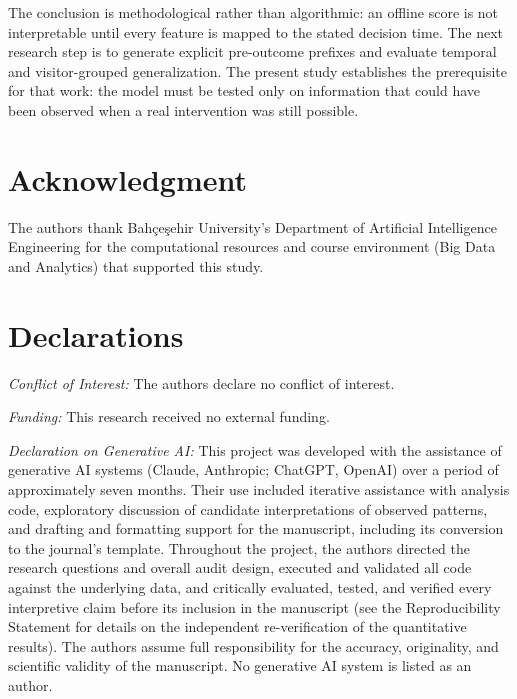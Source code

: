 \documentclass[conference, letterpaper]{IEEEtran}
\begin{document}
The conclusion is methodological rather than algorithmic: an offline score is not interpretable until every feature is mapped to the stated decision time. The next research step is to generate explicit pre-outcome prefixes and evaluate temporal and visitor-grouped generalization. The present study establishes the prerequisite for that work: the model must be tested only on information that could have been observed when a real intervention was still possible.

\section*{Acknowledgment}
The authors thank Bah\c{c}e\c{s}ehir University's Department of Artificial Intelligence Engineering for the computational resources and course environment (Big Data and Analytics) that supported this study.

\section*{Declarations}
\textit{Conflict of Interest:} The authors declare no conflict of interest.

\textit{Funding:} This research received no external funding.

\textit{Declaration on Generative AI:} This project was developed with the assistance of generative AI systems (Claude, Anthropic; ChatGPT, OpenAI) over a period of approximately seven months. Their use included iterative assistance with analysis code, exploratory discussion of candidate interpretations of observed patterns, and drafting and formatting support for the manuscript, including its conversion to the journal's template. Throughout the project, the authors directed the research questions and overall audit design, executed and validated all code against the underlying data, and critically evaluated, tested, and verified every interpretive claim before its inclusion in the manuscript (see the Reproducibility Statement for details on the independent re-verification of the quantitative results). The authors assume full responsibility for the accuracy, originality, and scientific validity of the manuscript. No generative AI system is listed as an author.



\end{document}
